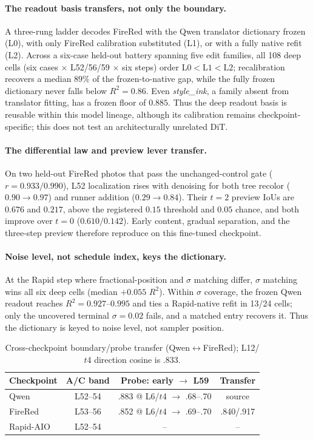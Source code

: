 \documentclass[letterpaper]{article} %
\begin{document}
\paragraph{The readout basis transfers, not only the boundary.} A three-rung
ladder decodes FireRed with the Qwen translator dictionary frozen (L0), with
only FireRed calibration substituted (L1), or with a fully native refit (L2).
Across a six-case held-out battery spanning five edit families, all 108 deep
cells (six cases $\times$ L52/56/59 $\times$ six steps) order
$\mathrm{L0}<\mathrm{L1}<\mathrm{L2}$; recalibration recovers a median $89\%$
of the frozen-to-native
gap, while the fully frozen dictionary never falls below $R^2{=}0.86$. Even
\emph{style\_ink}, a family absent from translator fitting, has a frozen floor
of $0.885$. Thus the deep readout basis is reusable within this model lineage,
although its calibration remains checkpoint-specific; this does not test an
architecturally unrelated DiT.

\paragraph{The differential law and preview lever transfer.} On two held-out
FireRed photos that pass the unchanged-control gate ($r{=}0.933/0.990$), L52
localization rises with denoising for both tree recolor ($0.90{\to}0.97$) and
runner addition ($0.29{\to}0.84$). Their $t{=}2$ preview IoUs are $0.676$ and
$0.217$, above the registered $0.15$ threshold and $0.05$ chance, and both
improve over $t{=}0$ ($0.610/0.142$). Early content, gradual separation, and
the three-step preview therefore reproduce on this fine-tuned checkpoint.

\paragraph{Noise level, not schedule index, keys the dictionary.} At the Rapid
step where fractional-position and $\sigma$ matching differ, $\sigma$ matching
wins all six deep cells (median $+0.055$ $R^2$). Within $\sigma$ coverage, the
frozen Qwen readout reaches $R^2{=}0.927$--$0.995$ and ties a Rapid-native refit
in 13/24 cells; only the uncovered terminal $\sigma{=}0.02$ fails, and a matched
entry recovers it. Thus the dictionary is keyed to noise level, not sampler
position.

\begin{table}[t]
\caption{Cross-checkpoint boundary/probe transfer
(Qwen$\leftrightarrow$FireRed); L12/$t$4 direction cosine is .833.}
\label{tab:generalize}
\centering
\scriptsize
\setlength{\tabcolsep}{3pt}
\begin{tabular}{@{}lccc@{}}
\toprule
Checkpoint & A/C band & Probe: early $\to$ L59 & Transfer \\
\midrule
Qwen & L52--54 & .883 @ L6/$t$4 $\to$ .68--.70 & source \\
FireRed & L53--56 & .852 @ L6/$t$4 $\to$ .69--.70 & .840/.917 \\
Rapid-AIO & L52--54 & -- & -- \\
\bottomrule
\end{tabular}
\end{table}
\end{document}
